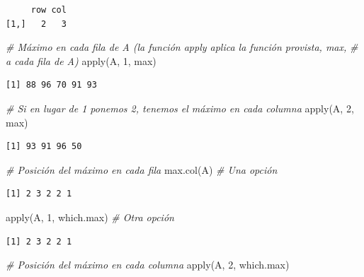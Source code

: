 \documentclass[
]{book}
\newenvironment{Shaded}{\begin{snugshade}}{\end{snugshade}}
\newcommand{\CommentTok}[1]{\textcolor[rgb]{0.56,0.35,0.01}{\textit{#1}}}
\newcommand{\DecValTok}[1]{\textcolor[rgb]{0.00,0.00,0.81}{#1}}
\newcommand{\FunctionTok}[1]{\textcolor[rgb]{0.00,0.00,0.00}{#1}}
\newcommand{\NormalTok}[1]{#1}
\begin{document}
\begin{itemize}
\begin{verbatim}
     row col
[1,]   2   3
\end{verbatim}

\begin{Shaded}
\begin{Highlighting}[]
\CommentTok{\# Máximo en cada fila de A (la función apply aplica la función provista, max, }
\CommentTok{\# a cada fila de A)}
\FunctionTok{apply}\NormalTok{(A, }\DecValTok{1}\NormalTok{, max)}
\end{Highlighting}
\end{Shaded}

\begin{verbatim}
[1] 88 96 70 91 93
\end{verbatim}

\begin{Shaded}
\begin{Highlighting}[]
\CommentTok{\# Si en lugar de 1 ponemos 2, tenemos el máximo en cada columna}
\FunctionTok{apply}\NormalTok{(A, }\DecValTok{2}\NormalTok{, max)}
\end{Highlighting}
\end{Shaded}

\begin{verbatim}
[1] 93 91 96 50
\end{verbatim}

\begin{Shaded}
\begin{Highlighting}[]
\CommentTok{\# Posición del máximo en cada fila}
\FunctionTok{max.col}\NormalTok{(A) }\CommentTok{\# Una opción}
\end{Highlighting}
\end{Shaded}

\begin{verbatim}
[1] 2 3 2 2 1
\end{verbatim}

\begin{Shaded}
\begin{Highlighting}[]
\FunctionTok{apply}\NormalTok{(A, }\DecValTok{1}\NormalTok{, which.max) }\CommentTok{\# Otra opción}
\end{Highlighting}
\end{Shaded}

\begin{verbatim}
[1] 2 3 2 2 1
\end{verbatim}

\begin{Shaded}
\begin{Highlighting}[]
\CommentTok{\# Posición del máximo en cada columna}
\FunctionTok{apply}\NormalTok{(A, }\DecValTok{2}\NormalTok{, which.max)}
\end{Highlighting}
\end{Shaded}


\end{itemize}
\end{document}
